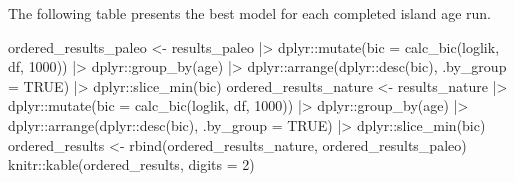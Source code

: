 \documentclass[
]{article}
\newenvironment{Shaded}{\begin{snugshade}}{\end{snugshade}}
\newcommand{\AttributeTok}[1]{\textcolor[rgb]{0.77,0.63,0.00}{#1}}
\newcommand{\ConstantTok}[1]{\textcolor[rgb]{0.00,0.00,0.00}{#1}}
\newcommand{\DecValTok}[1]{\textcolor[rgb]{0.00,0.00,0.81}{#1}}
\newcommand{\FunctionTok}[1]{\textcolor[rgb]{0.00,0.00,0.00}{#1}}
\newcommand{\NormalTok}[1]{#1}
\newcommand{\OtherTok}[1]{\textcolor[rgb]{0.56,0.35,0.01}{#1}}
\newcommand{\SpecialCharTok}[1]{\textcolor[rgb]{0.00,0.00,0.00}{#1}}
\begin{document}
The following table presents the best model for each completed island
age run.

\begin{Shaded}
\begin{Highlighting}[]
\NormalTok{ordered\_results\_paleo }\OtherTok{\textless{}{-}}\NormalTok{ results\_paleo }\SpecialCharTok{|\textgreater{}}
\NormalTok{  dplyr}\SpecialCharTok{::}\FunctionTok{mutate}\NormalTok{(}\AttributeTok{bic =} \FunctionTok{calc\_bic}\NormalTok{(loglik, df, }\DecValTok{1000}\NormalTok{)) }\SpecialCharTok{|\textgreater{}}
\NormalTok{  dplyr}\SpecialCharTok{::}\FunctionTok{group\_by}\NormalTok{(age) }\SpecialCharTok{|\textgreater{}}
\NormalTok{  dplyr}\SpecialCharTok{::}\FunctionTok{arrange}\NormalTok{(dplyr}\SpecialCharTok{::}\FunctionTok{desc}\NormalTok{(bic), }\AttributeTok{.by\_group =} \ConstantTok{TRUE}\NormalTok{) }\SpecialCharTok{|\textgreater{}}\NormalTok{ dplyr}\SpecialCharTok{::}\FunctionTok{slice\_min}\NormalTok{(bic)}
\NormalTok{ordered\_results\_nature }\OtherTok{\textless{}{-}}\NormalTok{ results\_nature }\SpecialCharTok{|\textgreater{}}
\NormalTok{  dplyr}\SpecialCharTok{::}\FunctionTok{mutate}\NormalTok{(}\AttributeTok{bic =} \FunctionTok{calc\_bic}\NormalTok{(loglik, df, }\DecValTok{1000}\NormalTok{)) }\SpecialCharTok{|\textgreater{}}
\NormalTok{  dplyr}\SpecialCharTok{::}\FunctionTok{group\_by}\NormalTok{(age) }\SpecialCharTok{|\textgreater{}}
\NormalTok{  dplyr}\SpecialCharTok{::}\FunctionTok{arrange}\NormalTok{(dplyr}\SpecialCharTok{::}\FunctionTok{desc}\NormalTok{(bic), }\AttributeTok{.by\_group =} \ConstantTok{TRUE}\NormalTok{) }\SpecialCharTok{|\textgreater{}}\NormalTok{ dplyr}\SpecialCharTok{::}\FunctionTok{slice\_min}\NormalTok{(bic)}
\NormalTok{ordered\_results }\OtherTok{\textless{}{-}} \FunctionTok{rbind}\NormalTok{(ordered\_results\_nature, ordered\_results\_paleo)}
\NormalTok{knitr}\SpecialCharTok{::}\FunctionTok{kable}\NormalTok{(ordered\_results, }\AttributeTok{digits =} \DecValTok{2}\NormalTok{)}
\end{Highlighting}
\end{Shaded}
\end{document}

